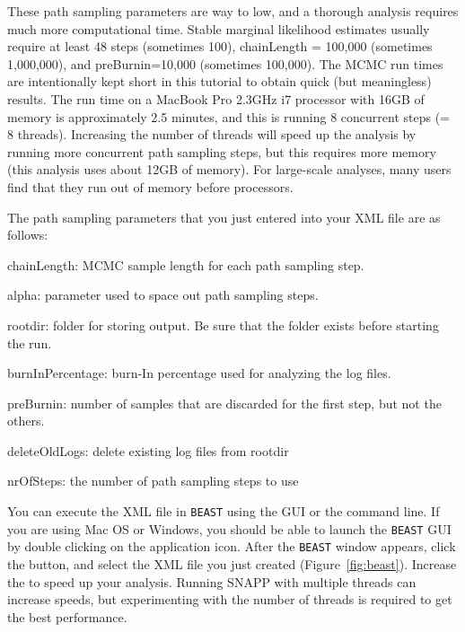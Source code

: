 {	These path sampling parameters are way to low, and a thorough analysis requires much more computational time. Stable marginal likelihood estimates usually require at least 48 steps (sometimes 100), chainLength = 100,000 (sometimes 1,000,000), and preBurnin=10,000 (sometimes 100,000). The MCMC run times are 
    intentionally kept short in this tutorial to obtain quick (but meaningless) results. The run time on a MacBook Pro 2.3GHz i7 processor with 16GB of memory is approximately 2.5 minutes, and this is running 8 concurrent steps (= 8 threads). Increasing the number of threads will speed up the analysis by running more concurrent path sampling steps, but this requires more memory (this analysis uses about 12GB of memory). For large-scale analyses, many users find that they run out of memory before processors.

The path sampling parameters that you just entered into your XML file are as follows:

    \begin{compactdesc}
       \item[chainLength:]{MCMC sample length for each path sampling step.}
       \item[alpha:]{parameter used to space out path sampling steps.}
       \item[rootdir:]{folder for storing output. Be sure that the folder exists before starting the run.}
       \item[burnInPercentage:]{burn-In percentage used for analyzing the log files.}
       \item[preBurnin:]{number of samples that are discarded for the first step, but not the others.}
       \item[deleteOldLogs:]{delete existing log files from rootdir}
       \item[nrOfSteps:]{the number of path sampling steps to use}
    \end{compactdesc}

	    You can execute the XML file in \texttt{BEAST} using the GUI or the command line. If you are using Mac OS or Windows, you should 
	    be able to launch the \texttt{BEAST} GUI by double clicking on the application icon. 
	    After the \texttt{BEAST} window appears, click the  button, 
	    and select the XML file you just created (Figure~\ref{fig:beast}). Increase the  to speed up your analysis. 
	    Running SNAPP with multiple threads can increase speeds, but experimenting with the number of threads is required to get the best performance.

}
